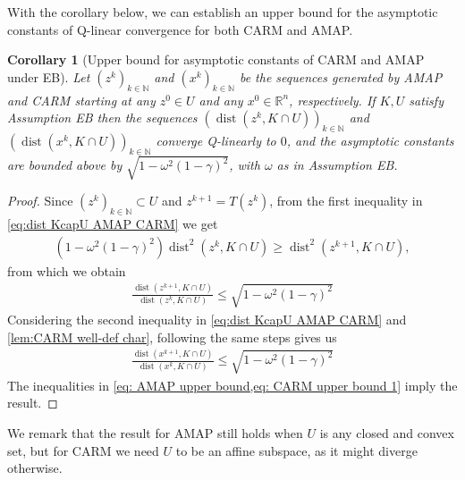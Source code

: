 \documentclass[smallextended,numbook,nospthms]{svjour3}
\theoremstyle{plain}
\newtheorem{corollary}[theorem]{Corollary}
\theoremstyle{definition}
\def\RR{\mathds R}
\def\NN{\mathds N}
\DeclareMathOperator{\dist}{dist}
\begin{document}
With the corollary below, we can establish an upper bound for the asymptotic constants of Q-linear convergence for both CARM and AMAP.
\begin{corollary}[Upper bound for asymptotic constants of CARM and AMAP under EB]\label{prop:EB Q conv}
	Let $\left(z^{k}\right)_{k \in \NN}$ and $\left(x^{k}\right)_{k \in \NN}$ be the sequences generated by AMAP and CARM starting at any $z^{0} \in U$ and any $x^{0} \in \RR^{n}$, respectively. If $K, U$ satisfy Assumption EB then the sequences $\left(\dist\left(z^{k}, K \cap U\right)\right)_{k \in \NN}$ and $\left(\dist\left(x^{k}, K \cap U\right)\right)_{k \in \NN}$ converge Q-linearly to $0$, and the asymptotic constants are bounded above by $\sqrt{1-\omega^{2}(1-\gamma)^{2}}$, with $\omega$ as in Assumption EB.
\end{corollary}
\begin{proof}
    Since $\left(z^{k}\right)_{k \in \NN} \subset U$ and $z^{k+1}=T\left(z^{k}\right)$, from the first inequality in \cref{eq:dist KcapU AMAP CARM} we get
	\begin{align}
		\left(1-\omega^{2}(1-\gamma)^{2}\right) \dist^{2}\left(z^{k}, K \cap U\right) \geq \dist^{2}\left(z^{k+1}, K \cap U\right),
	\end{align}
    from which we obtain
	\begin{align}\label{eq: AMAP upper bound}
		\frac{\dist\left(z^{k+1}, K \cap U\right)}{\dist\left(z^{k}, K \cap U\right)} \leq \sqrt{1-\omega^{2}(1-\gamma)^{2}}
	\end{align}
	Considering the second inequality in \cref{eq:dist KcapU AMAP CARM} and \cref{lem:CARM well-def char}, following the same steps gives us
	\begin{align}\label{eq: CARM upper bound 1}
		\frac{\dist\left(x^{k+1}, K \cap U\right)}{\dist\left(x^{k}, K \cap U\right)} \leq \sqrt{1-\omega^{2}(1-\gamma)^{2}}
	\end{align}
	The inequalities in \cref{eq: AMAP upper bound,eq: CARM upper bound 1} imply the result.
\end{proof}
We remark that the result for AMAP still holds when $U$ is any closed and convex set, but for  CARM we need $U$ to be an affine subspace, as it might diverge otherwise.
\end{document}
